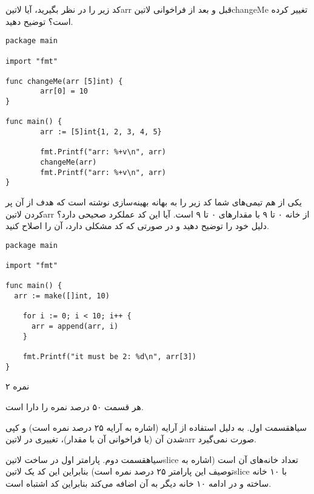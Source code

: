 \documentclass[../main.tex]{subfiles}
\begin{document}

کد زیر را در نظر بگیرید، آیا ‌لاتین{arr} قبل و بعد از فراخوانی ‌لاتین{changeMe} تغییر کرده است؟ توضیح دهید.

\begin{latin}
\begin{verbatim}
package main

import "fmt"

func changeMe(arr [5]int) {
        arr[0] = 10
}

func main() {
        arr := [5]int{1, 2, 3, 4, 5}

        fmt.Printf("arr: %+v\n", arr)
        changeMe(arr)
        fmt.Printf("arr: %+v\n", arr)
}
\end{verbatim}
\end{latin}

یکی از هم تیمی‌های شما کد زیر را به بهانه بهینه‌سازی نوشته است که هدف
از آن پر کردن ‌لاتین{arr} از خانه ۰ تا ۹ با مقدارهای ۰ تا ۹ است.
آیا این کد عملکرد صحیحی دارد؟ دلیل خود را توضیح دهید و در صورتی
که کد مشکلی دارد، آن را اصلاح کنید.

\begin{latin}
\begin{verbatim}
package main

import "fmt"

func main() {
  arr := make([]int, 10)

    for i := 0; i < 10; i++ {
      arr = append(arr, i)
    }

    fmt.Printf("it must be 2: %d\n", arr[3])
}

\end{verbatim}
\end{latin}

۲ نمره

\begin{answer}

هر قسمت ۵۰ درصد نمره را دارا است.

‌سیاه{قسمت اول}.
به دلیل استفاده از آرایه (اشاره به آرایه ۲۵ درصد نمره است) و کپی شدن آن (یا فراخوانی آن با مقدار)، تغییری در ‌لاتین{arr} صورت نمی‌گیرد.

‌سیاه{قسمت دوم}.
پارامتر اول در ساخت ‌لاتین{slice} تعداد خانه‌های آن است (اشاره به توصیف این پارامتر ۲۵ درصد نمره است) بنابراین این کد یک ‌لاتین{slice} با ۱۰ خانه ساخته و در ادامه ۱۰ خانه دیگر به آن اضافه می‌کند بنابراین
کد اشتباه است.

\end{answer}
\end{document}
